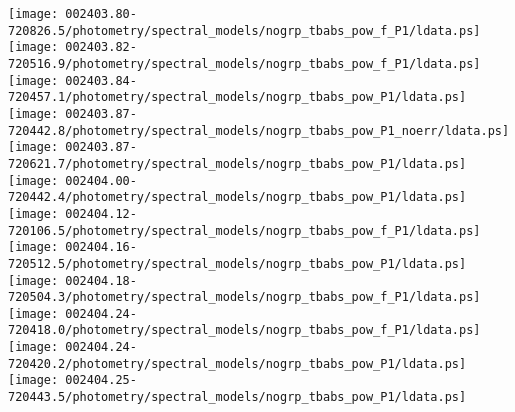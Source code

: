 \documentclass{aastex}
\begin{document}
\begin{figure*}[!ht]
\centering
\texttt{[image: 002403.80-720826.5/photometry/spectral\_models/nogrp\_tbabs\_pow\_f\_P1/ldata.ps]} \hfill 
\texttt{[image: 002403.82-720516.9/photometry/spectral\_models/nogrp\_tbabs\_pow\_f\_P1/ldata.ps]} \hfill 
\texttt{[image: 002403.84-720457.1/photometry/spectral\_models/nogrp\_tbabs\_pow\_P1/ldata.ps]} \\ 
\vspace*{0.5in}
\texttt{[image: 002403.87-720442.8/photometry/spectral\_models/nogrp\_tbabs\_pow\_P1\_noerr/ldata.ps]} \hfill 
\texttt{[image: 002403.87-720621.7/photometry/spectral\_models/nogrp\_tbabs\_pow\_P1/ldata.ps]} \hfill 
\texttt{[image: 002404.00-720442.4/photometry/spectral\_models/nogrp\_tbabs\_pow\_P1/ldata.ps]} \\ 
\vspace*{0.5in}
\texttt{[image: 002404.12-720106.5/photometry/spectral\_models/nogrp\_tbabs\_pow\_f\_P1/ldata.ps]} \hfill 
\texttt{[image: 002404.16-720512.5/photometry/spectral\_models/nogrp\_tbabs\_pow\_P1/ldata.ps]} \hfill 
\texttt{[image: 002404.18-720504.3/photometry/spectral\_models/nogrp\_tbabs\_pow\_f\_P1/ldata.ps]} \\ 
\vspace*{0.5in}
\texttt{[image: 002404.24-720418.0/photometry/spectral\_models/nogrp\_tbabs\_pow\_f\_P1/ldata.ps]} \hfill 
\texttt{[image: 002404.24-720420.2/photometry/spectral\_models/nogrp\_tbabs\_pow\_P1/ldata.ps]} \hfill 
\texttt{[image: 002404.25-720443.5/photometry/spectral\_models/nogrp\_tbabs\_pow\_P1/ldata.ps]} \\ 
\vspace*{0.5in}
\end{figure*}
\clearpage
\end{document}

